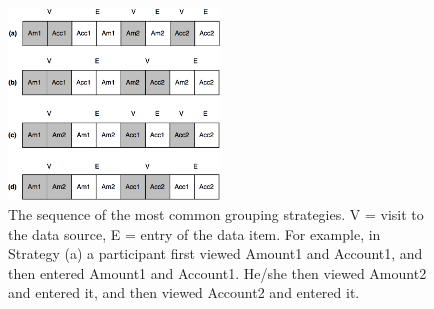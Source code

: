 \begin{figure}[!ht]
  \centering
    \includegraphics[width=0.5\textwidth]{images/ch34/ch34_4-groupstr.png}
      \caption{The sequence of the most common grouping strategies. V = visit to the data source, E = entry of the data item. For example, in Strategy (a) a participant first viewed Amount1 and Account1, and then entered Amount1 and Account1. He/she then viewed Amount2 and entered it, and then viewed Account2 and entered it.}
          \label{fig:ch34_4-groupstr}
\end{figure}

